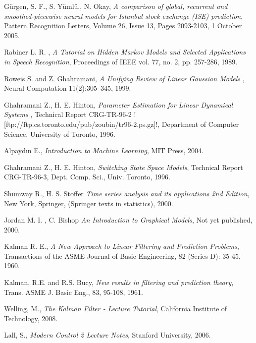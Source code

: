 
\begin{thebibliography}{99}
  
 Gürgen, S. F., S. Yümlü., N. Okay,
  {\em A comparison of global, recurrent and smoothed-piecewise neural models
    for Istanbul stock exchange (ISE) prediction}, 
  Pattern Recognition Letters, Volume 26, Issue 13, Pages 2093-2103, 
  1 October 2005.

 Rabiner L. R. , 
  {\em A Tutorial on Hidden Markov Models and Selected Applications in Speech Recognition}, 
  Proceedings of IEEE vol. 77, no. 2, pp. 257-286, 
  1989.

 Roweis S. and Z. Ghahramani,
  {\em  A Unifying Review of Linear Gaussian Models },
   Neural Computation 11(2):305--345, 
   1999.
   
 Ghahramani Z., H. E. Hinton, 
  {\em Parameter Estimation for Linear Dynamical Systems },
   Technical Report CRG-TR-96-2  
   \PVerb![ftp://ftp.cs.toronto.edu/pub/zoubin/tr96-2.ps.gz]!,
   Department of Computer Science, University of Toronto, 
   1996.

 Alpaydın E., 
  {\em Introduction to Machine Learning},
  MIT Press, 
  2004.   
   
 Ghahramani Z., H. E. Hinton,
  {\em Switching State Space Models},
  Technical Report CRG-TR-96-3, Dept. Comp. Sci., Univ. Toronto, 
  1996.
   
 Shumway R., H. S. Stoffer
  {\em Time series analysis and its applications 2nd Edition},
   New York, Springer, (Springer texts in statistics),
   2000.
   
 Jordan M. I. , C. Bishop
  {\em An Introduction to Graphical Models},
   Not yet published, 
   2000.

 Kalman R. E.,
  {\em A New Approach to Linear Filtering and Prediction Problems},
  Transactions of the ASME-Journal of Basic Engineering, 82 (Series D): 35-45, 
  1960.

 Kalman, R.E. and R.S. Bucy, 
  {\em New results in filtering and prediction theory},
  Trans. ASME J. Basic Eng., 83, 95-108,
  1961.
  
 Welling, M.,
  {\em The Kalman Filter - Lecture Tutorial},
   California Institute of Technology,
   2008.
   
 Lall, S.,
  {\em Modern Control 2 Lecture Notes},
   Stanford University,
   2006.
   

\end{thebibliography}
